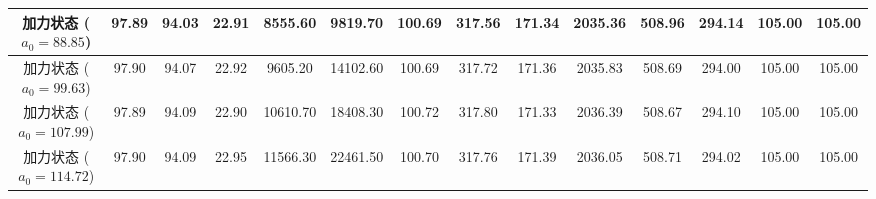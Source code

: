 \begin{table}[H]
{\begin{tabular}{|c|*{13}{c|}}
      \hline
      \makecell{加力状态 \\ ($a_0=88.85$)} & 97.89 & 94.03 & 22.91 & 8555.60 & 9819.70 & 100.69 & 317.56 & 171.34 & 2035.36 & 508.96 & 294.14 & 105.00 & 105.00 \\
      \hline
      \makecell{加力状态 \\ ($a_0=99.63$)} & 97.90 & 94.07 & 22.92 & 9605.20 & 14102.60 & 100.69 & 317.72 & 171.36 & 2035.83 & 508.69 & 294.00 & 105.00 & 105.00 \\
      \hline
      \makecell{加力状态 \\ ($a_0=107.99$)} & 97.89 & 94.09 & 22.90 & 10610.70 & 18408.30 & 100.72 & 317.80 & 171.33 & 2036.39 & 508.67 & 294.10 & 105.00 & 105.00 \\
      \hline
      \makecell{加力状态 \\ ($a_0=114.72$)} & 97.90 & 94.09 & 22.95 & 11566.30 & 22461.50 & 100.70 & 317.76 & 171.39 & 2036.05 & 508.71 & 294.02 & 105.00 & 105.00 \\
      \hline
    \end{tabular}
  }
\end{table}